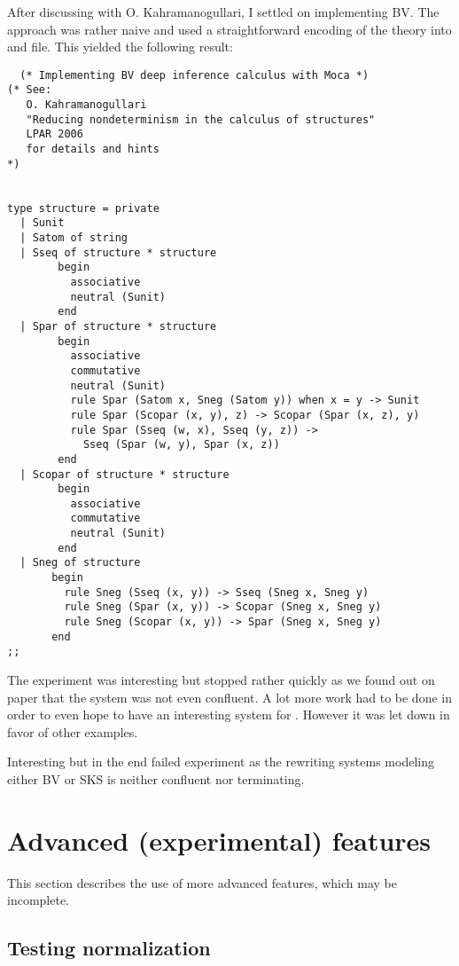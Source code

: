 After discussing with O. Kahramanogullari, I settled on implementing
BV. The approach was rather naive and used a straightforward encoding
of the theory into and \mlm file. This yielded the following result:
\begin{lstlisting}
  (* Implementing BV deep inference calculus with Moca *)
(* See:
   O. Kahramanogullari
   "Reducing nondeterminism in the calculus of structures"
   LPAR 2006
   for details and hints
*)
 

type structure = private
  | Sunit
  | Satom of string
  | Sseq of structure * structure
        begin
          associative
          neutral (Sunit)
        end
  | Spar of structure * structure
        begin
          associative
          commutative
          neutral (Sunit)
          rule Spar (Satom x, Sneg (Satom y)) when x = y -> Sunit
          rule Spar (Scopar (x, y), z) -> Scopar (Spar (x, z), y)
          rule Spar (Sseq (w, x), Sseq (y, z)) ->
            Sseq (Spar (w, y), Spar (x, z))
        end
  | Scopar of structure * structure
        begin
          associative
          commutative
          neutral (Sunit)
        end
  | Sneg of structure
       begin
         rule Sneg (Sseq (x, y)) -> Sseq (Sneg x, Sneg y)
         rule Sneg (Spar (x, y)) -> Scopar (Sneg x, Sneg y)
         rule Sneg (Scopar (x, y)) -> Spar (Sneg x, Sneg y)
       end
;;

\end{lstlisting}

The experiment was interesting but stopped rather quickly as we found
out on paper that the system was not even confluent. A lot more work
had to be done in order to even hope to have an interesting system for
\moca. However it was let down in favor of other examples.

Interesting but in the end failed experiment as the rewriting
systems modeling either BV or SKS is neither confluent nor terminating.

\section{Advanced (experimental) features}
\label{sec:adv}

This section describes the use of more advanced \moca features, which
may be incomplete. 

\subsection{Testing normalization}
\label{sec:testing}

